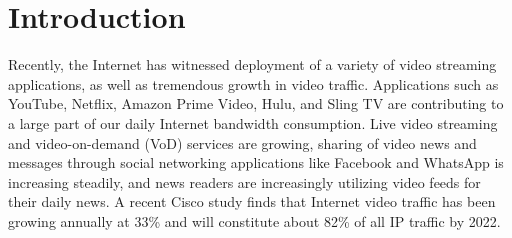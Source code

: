 \documentclass[conference]{IEEEtran}
\begin{document}

\section{Introduction}
Recently, the Internet has witnessed deployment of a variety of video streaming applications, as well as tremendous growth in video traffic. Applications such as YouTube, Netflix, Amazon Prime Video, Hulu, and Sling TV are contributing to a large part of our daily Internet bandwidth consumption. Live video streaming and video-on-demand (VoD) services are growing, sharing of video news and messages through social networking applications like Facebook and WhatsApp is increasing steadily, and news readers are increasingly utilizing video feeds for their daily news. A recent Cisco study \cite{Cisco2019} finds that Internet video traffic has been growing annually at 33\% and will constitute about 82\% of all IP traffic by 2022.
\end{document}
